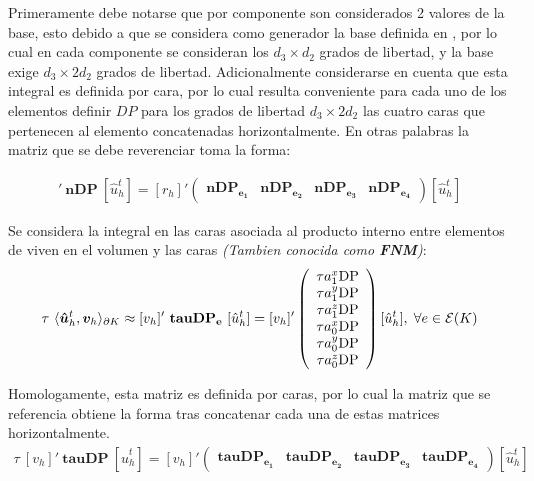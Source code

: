 \documentclass{article}
\begin{document}
\noindent Primeramente debe notarse que por componente son considerados 2 valores de la base, esto debido a que se considera como generador la base definida en , por lo cual en cada componente se consideran los $d_3 \times d_2$ grados de libertad, y la base exige $d_3 \times 2d_2$ grados de libertad. Adicionalmente considerarse en cuenta que esta integral es definida por cara, por lo cual resulta conveniente para cada uno de los elementos definir $DP$ para los grados de libertad $d_3 \times 2d_2$ las cuatro caras que pertenecen al elemento concatenadas horizontalmente. En otras palabras la matriz que se debe reverenciar toma la forma:

\begin{align}
    [r_h]'~\mathbf{nDP}~[\hat{u}_h^t]  = 
    [r_h]'
    \left(
    \begin{array}{cccc}
        \mathbf{nDP_{e_1}} & \mathbf{nDP_{e_2}} & \mathbf{nDP_{e_3}} & \mathbf{nDP_{e_4}}
    \end{array}
    \right)
    [\hat{u}_h^t]
\end{align}

\noindent Se considera la integral en las caras asociada al producto interno entre elementos de viven en el volumen y las caras \textit{(Tambien conocida como \textbf{FNM})}: 
\begin{align*}
    \tau~\langle \boldsymbol{\hat{u}}_h^t, \boldsymbol{v}_h \rangle_{\partial K} \approx
    [v_h]'~\mathbf{tauDP_e}~[\hat{u}_h^t]  = 
    [v_h]'
    \left(
    \begin{array}{cccccc}
        \tau a_{1}^{x} \mathrm{DP} \\
        \tau a_{1}^{y}\mathrm{DP} \\
        \tau a_{1}^{z} \mathrm{DP} \\
        \tau a_{0}^{x} \mathrm{DP} \\
        \tau a_{0}^{y}\mathrm{DP} \\
        \tau a_{0}^{z} \mathrm{DP}
    \end{array}
    \right)
    [\hat{u}_h^t], \hspace{1mm}
    \forall e \in \mathcal{E}(K)
\end{align*}

\noindent Homologamente, esta matriz es definida por caras, por lo cual la matriz que se referencia obtiene la forma tras concatenar cada una de estas matrices horizontalmente.
\begin{align}
    \tau~[v_h]'~\mathbf{tauDP}~[\hat{u}_h^t]  = 
    [v_h]'
    \left(
    \begin{array}{cccc}
        \mathbf{tauDP_{e_1}} & \mathbf{tauDP_{e_2}} & \mathbf{tauDP_{e_3}} & \mathbf{tauDP_{e_4}}
    \end{array}
    \right)
    [\hat{u}_h^t]
\end{align}
\end{document}
